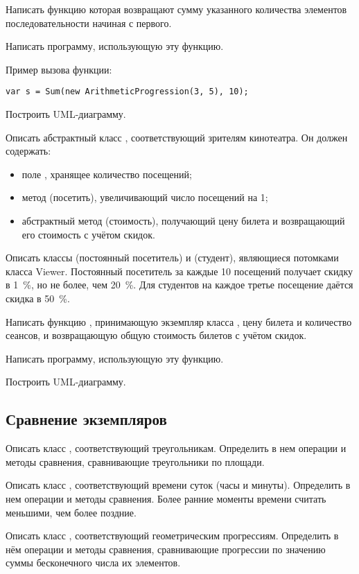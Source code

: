 Написать функцию  которая возвращают сумму указанного
количества элементов последовательности начиная с первого.

Написать программу, использующую эту функцию.

Пример вызова функции:
\begin{lstlisting}[numbers=none]
var s = Sum(new ArithmeticProgression(3, 5), 10);
\end{lstlisting}

Построить UML-диаграмму.

\task Описать абстрактный класс , соответствующий зрителям
кинотеатра. Он должен содержать:
\begin{itemize}
\item поле , хранящее количество посещений;
\item метод  (посетить), увеличивающий число посещений на
  1;
\item абстрактный метод  (стоимость), получающий цену билета
  и возвращающий его стоимость с учётом скидок.
\end{itemize}

Описать классы  (постоянный посетитель) и
 (студент), являющиеся потомками класса
Viewer. Постоянный посетитель за каждые 10 посещений получает скидку в
1~\%, но не более, чем 20~\%. Для студентов на каждое третье посещение
даётся скидка в 50~\%.

Написать функцию , принимающую экземпляр класса
, цену билета и количество сеансов, и возвращающую общую
стоимость билетов с учётом скидок.

Написать программу, использующую эту функцию.

Построить UML-диаграмму.


\subsection{Сравнение экземпляров}

\task Описать класс , соответствующий треугольникам.
Определить в нем операции и методы сравнения, сравнивающие
треугольники по площади.

\task Описать класс , соответствующий времени суток (часы и
минуты). Определить в нем операции и методы сравнения. Более ранние
моменты времени считать меньшими, чем более поздние.

\task Описать класс , соответствующий геометрическим
прогрессиям. Определить в нём операции и методы сравнения,
сравнивающие прогрессии по значению суммы бесконечного числа их
элементов.

